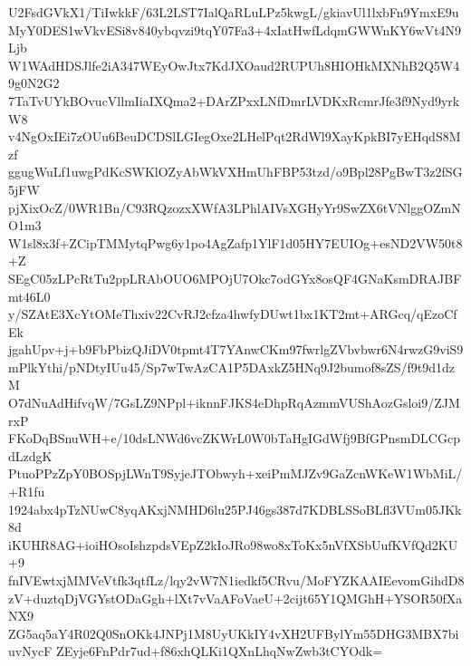 U2FsdGVkX1/TiIwkkF/63L2LST7IalQaRLuLPz5kwgL/gkiavUl1lxbFn9YmxE9u
MyY0DES1wVkvESi8v840ybqvzi9tqY07Fa3+4xIatHwfLdqmGWWnKY6wVt4N9Ljb
W1WAdHDSJlfe2iA347WEyOwJtx7KdJXOaud2RUPUh8HIOHkMXNhB2Q5W49g0N2G2
7TaTvUYkBOvucVllmIiaIXQma2+DArZPxxLNfDmrLVDKxRcmrJfe3f9Nyd9yrkW8
v4NgOxIEi7zOUu6BeuDCDSlLGIegOxe2LHelPqt2RdWl9XayKpkBI7yEHqdS8Mzf
ggugWuLf1uwgPdKcSWKlOZyAbWkVXHmUhFBP53tzd/o9Bpl28PgBwT3z2fSG5jFW
pjXixOcZ/0WR1Bn/C93RQzozxXWfA3LPhlAIVsXGHyYr9SwZX6tVNlggOZmNO1m3
W1sl8x3f+ZCipTMMytqPwg6y1po4AgZafp1YlF1d05HY7EUIOg+esND2VW50t8+Z
SEgC05zLPcRtTu2ppLRAbOUO6MPOjU7Okc7odGYx8osQF4GNaKsmDRAJBFmt46L0
y/SZAtE3XcYtOMeThxiv22CvRJ2cfza4hwfyDUwt1bx1KT2mt+ARGcq/qEzoCfEk
jgahUpv+j+b9FbPbizQJiDV0tpmt4T7YAnwCKm97fwrlgZVbvbwr6N4rwzG9viS9
mPlkYthi/pNDtyIUu45/Sp7wTwAzCA1P5DAxkZ5HNq9J2bumof8sZS/f9t9d1dzM
O7dNuAdHifvqW/7GsLZ9NPpl+iknnFJKS4eDhpRqAzmmVUShAozGsloi9/ZJMrxP
FKoDqBSnuWH+e/10dsLNWd6vcZKWrL0W0bTaHgIGdWfj9BfGPnsmDLCGcpdLzdgK
PtuoPPzZpY0BOSpjLWnT9SyjeJTObwyh+xeiPmMJZv9GaZcnWKeW1WbMiL/+R1fu
1924abx4pTzNUwC8yqAKxjNMHD6lu25PJ46gs387d7KDBLSSoBLfl3VUm05JKk8d
iKUHR8AG+ioiHOsoIshzpdsVEpZ2kIoJRo98wo8xToKx5nVfXSbUufKVfQd2KU+9
fnIVEwtxjMMVeVtfk3qtfLz/lqy2vW7N1iedkf5CRvu/MoFYZKAAIEevomGihdD8
zV+duztqDjVGYstODaGgh+lXt7vVaAFoVaeU+2cijt65Y1QMGhH+YSOR50fXaNX9
ZG5aq5aY4R02Q0SnOKk4JNPj1M8UyUKkIY4vXH2UFBylYm55DHG3MBX7biuvNycF
ZEyje6FnPdr7ud+f86xhQLKi1QXnLhqNwZwb3tCYOdk=
